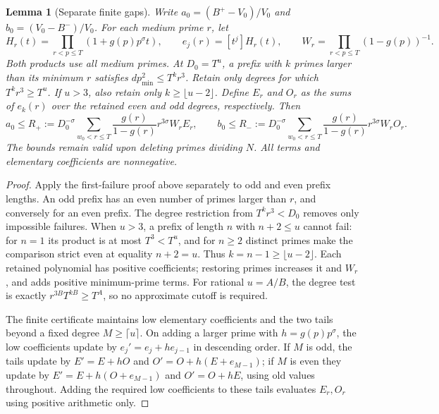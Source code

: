\documentclass[11pt]{article}
\newtheorem{lemma}[theorem]{Lemma}
\begin{document}
\begin{lemma}[Separate finite gaps]\label{lem:parity}
Write $a_0=(B^+-V_0)/V_0$ and $b_0=(V_0-B^-)/V_0$.
For each medium prime $r$, let
\[
H_r(t)=\prod_{r<p\le T}(1+g(p)p^\sigma t),\qquad
e_j(r)=[t^j]H_r(t),\qquad
W_r=\prod_{r<p\le T}(1-g(p))^{-1}.
\]
Both products use all medium primes. At $D_0=T^u$, a prefix with
$k$ primes larger than its minimum $r$ satisfies
$dp_{\min}^2\le T^kr^3$. Retain only degrees for which
$T^kr^3\ge T^u$. If $u>3$, also retain only $k\ge\lfloor u-2\rfloor$.
Define $E_r$ and $O_r$ as the sums of $e_k(r)$ over the retained even
and odd degrees, respectively. Then
\[
a_0\le R_+:=D_0^{-\sigma}\sum_{w_0<r\le T}
\frac{g(r)}{1-g(r)}r^{3\sigma}W_rE_r,\qquad
b_0\le R_-:=D_0^{-\sigma}\sum_{w_0<r\le T}
\frac{g(r)}{1-g(r)}r^{3\sigma}W_rO_r.
\]
The bounds remain valid upon deleting primes dividing $N$.
All terms and elementary coefficients are nonnegative.
\end{lemma}
\begin{proof}
Apply the first-failure proof above separately to odd and even prefix
lengths. An odd prefix has an even number of primes larger than $r$,
and conversely for an even prefix. The degree restriction from
$T^kr^3<D_0$ removes only impossible failures. When $u>3$, a prefix
of length $n$ with $n+2\le u$ cannot fail: for $n=1$ its product is
at most $T^3<T^u$, and for $n\ge2$ distinct primes make the comparison
strict even at equality $n+2=u$. Thus $k=n-1\ge\lfloor u-2\rfloor$.
Each retained polynomial has positive coefficients; restoring primes
increases it and $W_r$, and adds positive minimum-prime terms.
For rational $u=A/B$, the degree test is exactly
$r^{3B}T^{kB}\ge T^A$, so no approximate cutoff is required.

The finite certificate maintains low elementary coefficients and the
two tails beyond a fixed degree $M\ge\lceil u\rceil$.
On adding a larger prime with $h=g(p)p^\sigma$, the low coefficients
update by $e_j'=e_j+he_{j-1}$ in descending order.
If $M$ is odd, the tails update by
$E'=E+hO$ and $O'=O+h(E+e_{M-1})$; if $M$ is even they update by
$E'=E+h(O+e_{M-1})$ and $O'=O+hE$, using old values throughout.
Adding the required low coefficients to these tails evaluates
$E_r,O_r$ using positive arithmetic only.
\end{proof}
\end{document}
